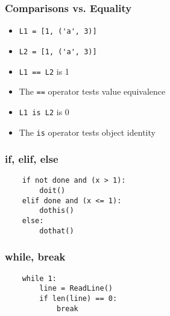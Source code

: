 
\begin{frame}[fragile]\frametitle{Comparisons vs. Equality}
  \begin{itemize}
  \item \lstinline{L1 = [1, ('a', 3)]}
  \item \lstinline{L2 = [1, ('a', 3)]}
  \item \lstinline{L1 == L2} is 1
    \item The \lstinline{==} operator tests value equivalence
    \item \lstinline{L1 is L2} is 0

  \item The \lstinline{is} operator tests object identity
  \end{itemize}
\end{frame}

\begin{frame}[fragile]\frametitle{if, elif, else}
  \begin{lstlisting}
	if not done and (x > 1):
		doit()
	elif done and (x <= 1):
		dothis()
	else:
		dothat()
  \end{lstlisting}
\end{frame}

\begin{frame}[fragile]\frametitle{while, break}
  \begin{lstlisting}
	while 1:
		line = ReadLine()
		if len(line) == 0:
			break
  \end{lstlisting}
\end{frame}

